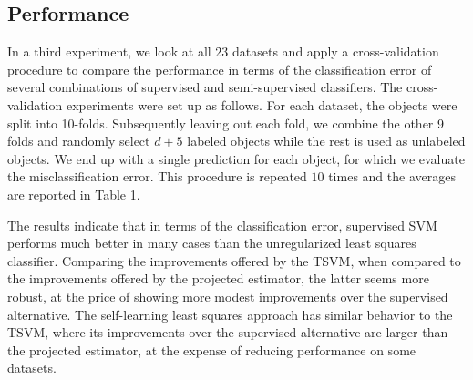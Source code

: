 \documentclass{article}
\begin{document}
\subsection{Performance}
In a third experiment, we look at all $23$ datasets and apply a cross-validation procedure to compare the performance in terms of the classification error of several combinations of supervised and semi-supervised classifiers. The cross-validation experiments were set up as follows. For each dataset, the objects were split into 10-folds. Subsequently leaving out each fold, we combine the other 9 folds and randomly select $d+5$ labeled objects while the rest is used as unlabeled objects. We end up with a single prediction for each object, for which we evaluate the misclassification error. This procedure is repeated $10$ times and the averages are reported in Table 1.

The results indicate that in terms of the classification error, supervised SVM performs much better in many cases than the unregularized least squares classifier. Comparing the improvements offered by the TSVM, when compared to the improvements offered by the projected estimator, the latter seems more robust, at the price of showing more modest improvements over the supervised alternative. The self-learning least squares approach has similar behavior to the TSVM, where its improvements over the supervised alternative are larger than the projected estimator, at the expense of reducing performance on some datasets.
\end{document}
